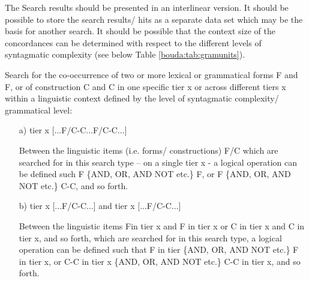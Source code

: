 The Search results should be presented in an interlinear version. It should be possible to store the search results/ hits as a separate data set which may be the basis for another search. It should be possible that the context size of the concordances can be determined with respect to the different levels of syntagmatic complexity (see below Table \ref{bouda:tab:gramunits}).
\z

Search for the co-occurrence of two or more lexical or grammatical forms F and F, or of construction C and C in one specific tier x or across different tiers x within a linguistic context defined by the level of syntagmatic complexity/ grammatical level:
 \begin{enumerate}
 \item[a)] tier x [...F/C-C...F/C-C...]

 Between the linguistic items (i.e. forms/ constructions) F/C which are searched for in this search type -- on a single tier x - a logical operation can be defined such F \{AND, OR, AND NOT etc.\} F, or F \{AND, OR, AND NOT etc.\} C-C, and so forth.

 \item[b)] tier x [...F/C-C...] and tier x [...F/C-C...]

 Between the linguistic items Fin tier x and F in tier x or C in tier x and C in tier x, and so forth, which are searched for in this search type, a logical operation can be defined such that F in tier  \{AND, OR, AND NOT etc.\} F in tier x, or C-C in tier x \{AND, OR, AND NOT etc.\} C-C in tier x, and so forth.

 \end{enumerate}


